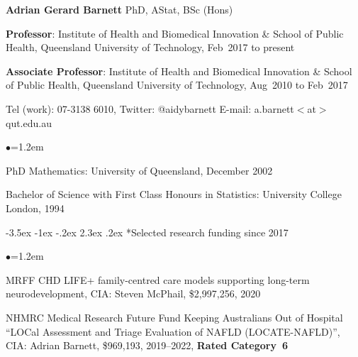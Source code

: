 \documentclass[a4paper,11pt]{article}
\makeatletter
\renewcommand\section{\@startsection {section}{1}{\z@}%
                                   {-3.5ex \@plus -1ex \@minus -.2ex}%
                                   {2.3ex \@plus.2ex}%
                                   {\normalfont\large\bfseries\color{blue}}}
\renewcommand{\labelitemi}{$\bullet$}
\makeatother
\begin{document}
\begin{raggedright}


\begin{center}
\textbf{Adrian Gerard Barnett} PhD, AStat, BSc (Hons)
\end{center}

\textbf{Professor}: Institute of Health and Biomedical Innovation \& School of Public Health, Queensland University of Technology, Feb~2017 to present

\textbf{Associate Professor}: Institute of Health and Biomedical Innovation \& School of Public Health, Queensland University of Technology, Aug~2010 to Feb~2017

Tel (work): 07-3138 6010, Twitter: @aidybarnett
E-mail: a.barnett$<$at$>$qut.edu.au

\begin{list}{\labelitemi}{\leftmargin=1.2em}\addtolength{\itemsep}{-0.5\baselineskip}
\item PhD Mathematics: University of Queensland, December 2002
\item Bachelor of Science with First Class Honours in Statistics: University College London, 1994
\end{list}

\label{papersstart}
\label{papersstop}

\section*{Selected research funding since 2017}

\begin{list}{\labelitemi}{\leftmargin=1.2em}\addtolength{\itemsep}{-0.5\baselineskip}

\item MRFF CHD LIFE+ family-centred care models supporting long-term neurodevelopment, CIA: Steven McPhail, \$2,997,256, 2020

\item NHMRC Medical Research Future Fund Keeping Australians Out of Hospital ``LOCal Assessment and Triage Evaluation of NAFLD (LOCATE-NAFLD)'', CIA: Adrian Barnett, \$969,193, 2019--2022, \textbf{Rated Category~6}


\end{list}
\end{raggedright}
\end{document}

